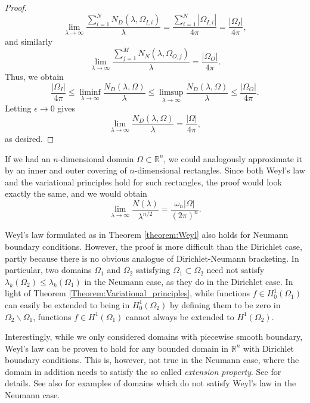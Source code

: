 \documentclass{amsart}
\theoremstyle{definition}
\newcommand*{\R}{\mathbb{R}}
\begin{document}
\begin{proof}
    \begin{equation*}
         \lim_{\lambda \to \infty} \frac{\sum_{i=1}^N N_D(\lambda, \Omega_{I,i})}{\lambda} = \frac{\sum_{i = 1}^N|\Omega_{I,i}|}{4\pi} = \frac{|\Omega_I|}{4\pi},
    \end{equation*}
    and similarly
    \begin{equation*}
         \lim_{\lambda \to \infty} \frac{\sum_{j=1}^M N_N(\lambda, \Omega_{O,j})}{\lambda} = \frac{|\Omega_O|}{4\pi}.
    \end{equation*}
    Thus, we obtain
    \begin{equation*}
        \frac{|\Omega_I|}{4\pi} \leq \liminf_{\lambda \to \infty} \frac{N_D(\lambda, \Omega)}{\lambda} \leq \limsup_{\lambda \to \infty} \frac{N_D(\lambda, \Omega)}{\lambda} \leq \frac{|\Omega_O|}{4\pi}.
    \end{equation*}
    Letting $\epsilon \to 0$ gives
    \begin{equation*}
        \lim_{\lambda \to \infty} \frac{N_D(\lambda, \Omega)}{\lambda} = \frac{|\Omega|}{4\pi},
    \end{equation*}
    as desired. 
    \end{proof}

If we had an $n$-dimensional domain $\Omega \subset \R^n$, we could analogously approximate it by an inner and outer covering of $n$-dimensional rectangles. Since both Weyl's law and the variational principles hold for such rectangles, the proof would look exactly the same, and we would obtain
\begin{equation*}
    \lim_{\lambda \to \infty} \frac{N(\lambda)}{\lambda^{n/2}} = \frac{\omega_n|\Omega|}{(2\pi)^n}.
\end{equation*}


Weyl's law formulated as in Theorem \ref{theorem:Weyl} also holds for Neumann boundary conditions. However, the proof is more difficult than the Dirichlet case, partly because there is no obvious analogue of Dirichlet-Neumann bracketing. In particular, two domains $\Omega_1$ and $\Omega_2$ satisfying $\Omega_1 \subset \Omega_2$ need not satisfy $\lambda_k(\Omega_2) \leq \lambda_k(\Omega_1)$ in the Neumann case, as they do in the Dirichlet case. In light of Theorem \ref{Theorem:Variational_principles}, while functions $f \in H_0^1(\Omega_1)$ can easily be extended to being in $H_0^1(\Omega_2)$ by defining them to be zero in $\Omega_2 \backslash \Omega_1$, functions $f \in H^1(\Omega_1)$ cannot always be extended to $H^1(\Omega_2)$.

Interestingly, while we only considered domains with piecewise smooth boundary, Weyl's law can be proven to hold for any bounded domain in $\R^n$ with Dirichlet boundary conditions. This is, however, not true in the Neumann case, where the domain in addition needs to satisfy the so called \textit{extension property}. See \cite[Ch. 3]{frank2022schrodinger} for details. See also \cite{jakvsic1992eigenvalue} for examples of domains which do not satisfy Weyl's law in the Neumann case.
\end{document}
